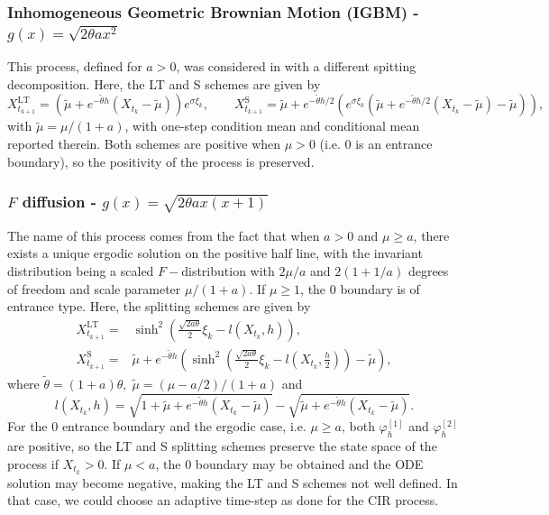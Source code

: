 \documentclass[a4paper,12pt]{article}
\numberwithin{equation}{section}
\theoremstyle{plain}
\theoremstyle{definition}
\begin{document}
\begin{appendix}
\subsubsection{Inhomogeneous Geometric Brownian Motion (IGBM) -  $g(x)=\sqrt{2\theta ax^2}$}
This process, defined for $a>0$, was considered in \cite{buckwar_splitting_2022} with a different spitting decomposition. Here, the LT and S schemes are given by 
\[
X^{\textrm{LT}}_{t_{k+1}}=\left(\tilde\mu + e^{-\tilde\theta h}(X_{t_k}-\tilde\mu)\right)e^{\sigma\xi_k},\qquad X^{\textrm{S}}_{t_{k+1}}=\tilde\mu+e^{-\tilde\theta h/2}\left(e^{\sigma \xi_k}\left(\tilde\mu+e^{-\tilde\theta h/2}(X_{t_k}-\tilde\mu)-\tilde\mu\right)\right),
\]
with $\tilde\mu=\mu/(1+a)$, 
with one-step condition mean and conditional mean reported therein. Both schemes are positive when $\mu>0$ (i.e. 0 is an entrance boundary), so the positivity of the process is preserved.

\subsubsection{$F$ diffusion  - $g(x)=\sqrt{2\theta ax(x+1)}$}
The name of this process comes from the fact that when $a>0$ and $\mu\geq a$, there exists a unique ergodic solution on the positive half line, with the invariant distribution being a scaled $F-$distribution with $2\mu/a$ and $ 2(1+1/a)$ degrees of freedom and scale parameter $\mu/(1+a)$. If $\mu\geq 1$, the 0 boundary is of entrance type. Here, the splitting schemes are given by 
\begin{align}
X^{\textrm{LT}}_{t_{k+1}}=&\sinh^2\left(\frac{\sqrt{2a\theta}}{2}{\xi_k}-l(X_{t_k},h)\right),\label{eqn:F LT}\\
    X^{\textrm{S}}_{t_{k+1}}=&\tilde{\mu}+e^{-\tilde{\theta}h}\left(\sinh^2\left(\frac{\sqrt{2a\theta}}{2}{\xi_k}-l(X_{t_k},\frac{h}{2})
    \right)-\tilde{\mu}\right),\label{eqn:F Strang}
\end{align}
where $\tilde{\theta}=(1+a)\theta,\; \tilde{\mu}=(\mu-a/2)/(1+a)$ and 
\begin{equation*}
l(X_{t_k},h)=\sqrt{1+\tilde{\mu}+e^{-\tilde{\theta}h}\left(X_{t_k}-\tilde{\mu}\right)}-\sqrt{\tilde{\mu}+e^{-\tilde{\theta}h}\left(X_{t_k}-\tilde{\mu}\right)}.
\end{equation*}
For the 0 entrance boundary and the ergodic case, i.e. $\mu\geq a$, both $\varphi_h^{[1]}$ and $\varphi_h^{[2]}$ are positive, so the LT and S splitting schemes preserve the state space of the process if $X_{t_k}>0$. If $\mu<a$, the 0 boundary may be obtained and the ODE solution may become  negative, making the LT and S schemes not well defined. In that case, we could choose an adaptive time-step as done for the CIR process. 


\end{appendix}
\end{document}
